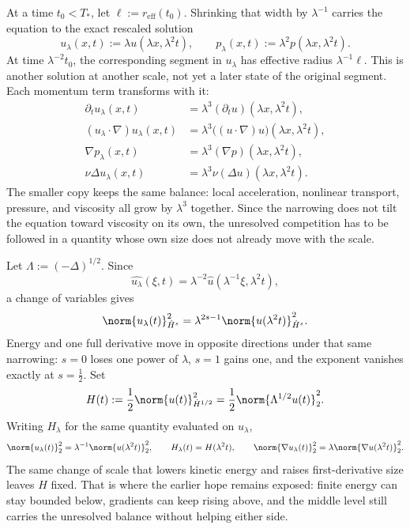 
At a time \(t_0<T_*\), let \(\ell:=r_{\mathrm{eff}}(t_0)\). Shrinking that width by \(\lambda^{-1}\) carries the equation to the exact rescaled solution
\[
  u_\lambda(x,t)
  :=
  \lambda u(\lambda x,\lambda^2t),
  \qquad
  p_\lambda(x,t)
  :=
  \lambda^2p(\lambda x,\lambda^2t).
\]
At time \(\lambda^{-2}t_0\), the corresponding segment in \(u_\lambda\) has effective radius \(\lambda^{-1}\ell\). This is another solution at another scale, not yet a later state of the original segment. Each momentum term transforms with it:
\[
\begin{aligned}
  \partial_tu_\lambda(x,t)
  &=
  \lambda^3(\partial_tu)(\lambda x,\lambda^2t),
  \\
  (u_\lambda\cdot\nabla)u_\lambda(x,t)
  &=
  \lambda^3\bigl((u\cdot\nabla)u\bigr)(\lambda x,\lambda^2t),
  \\
  \nabla p_\lambda(x,t)
  &=
  \lambda^3(\nabla p)(\lambda x,\lambda^2t),
  \\
  \nu\Delta u_\lambda(x,t)
  &=
  \lambda^3\nu(\Delta u)(\lambda x,\lambda^2t).
\end{aligned}
\]
The smaller copy keeps the same balance: local acceleration, nonlinear transport, pressure, and viscosity all grow by \(\lambda^3\) together. Since the narrowing does not tilt the equation toward viscosity on its own, the unresolved competition has to be followed in a quantity whose own size does not already move with the scale.


Let \(\Lambda:=(-\Delta)^{1/2}\). Since
\[
  \widehat{u_\lambda}(\xi,t)
  =
  \lambda^{-2}\widehat u(\lambda^{-1}\xi,\lambda^2t),
\]
a change of variables gives
\[
  \norm{u_\lambda(t)}_{\dot H^s}^2
  =
  \lambda^{2s-1}
  \norm{u(\lambda^2t)}_{\dot H^s}^2.
\]
Energy and one full derivative move in opposite directions under that same narrowing: \(s=0\) loses one power of \(\lambda\), \(s=1\) gains one, and the exponent vanishes exactly at \(s=\tfrac12\). Set
\[
  H(t)
  :=
  \frac12\norm{u(t)}_{\dot H^{1/2}}^2
  =
  \frac12\norm{\Lambda^{1/2}u(t)}_2^2.
\]
Writing \(H_\lambda\) for the same quantity evaluated on \(u_\lambda\),
\[
  \norm{u_\lambda(t)}_2^2
  =
  \lambda^{-1}\norm{u(\lambda^2t)}_2^2,
  \qquad
  H_\lambda(t)=H(\lambda^2t),
  \qquad
  \norm{\nabla u_\lambda(t)}_2^2
  =
  \lambda\norm{\nabla u(\lambda^2t)}_2^2.
\]
The same change of scale that lowers kinetic energy and raises first-derivative size leaves \(H\) fixed. That is where the earlier hope remains exposed: finite energy can stay bounded below, gradients can keep rising above, and the middle level still carries the unresolved balance without helping either side.

